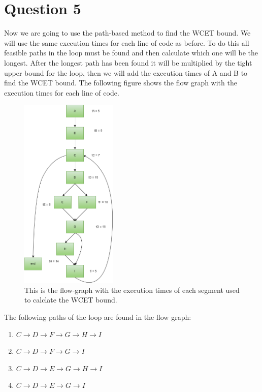 \section{Question 5}

    Now we are going to use the path-based method to find the WCET bound. We will use the same execution times for each line of code as before. To do this all feasible paths in the loop must be found and then calculate which one will be the longest. After the longest path has been found it will be multiplied by the tight upper bound for the loop, then we will add the execution times of A and B to find the WCET bound. The following figure shows the flow graph with the execution times for each line of code.

    \begin{figure}[H]
        \centering
        \includegraphics[height=350px]{images/Ass3Q5.png}
        \caption{This is the flow-graph with the execution times of each segment used to calclate the WCET bound.}
        \label{fig:path}
    \end{figure}

    The following paths of the loop are found in the flow graph:
    \begin{enumerate}
        \item  $C\rightarrow D\rightarrow F\rightarrow G\rightarrow H\rightarrow I$
        \item $C\rightarrow D\rightarrow F\rightarrow G\rightarrow I$
        \item $C\rightarrow D\rightarrow E\rightarrow G\rightarrow H\rightarrow I$
        \item $C\rightarrow D\rightarrow E\rightarrow G\rightarrow I$
    \end{enumerate}

